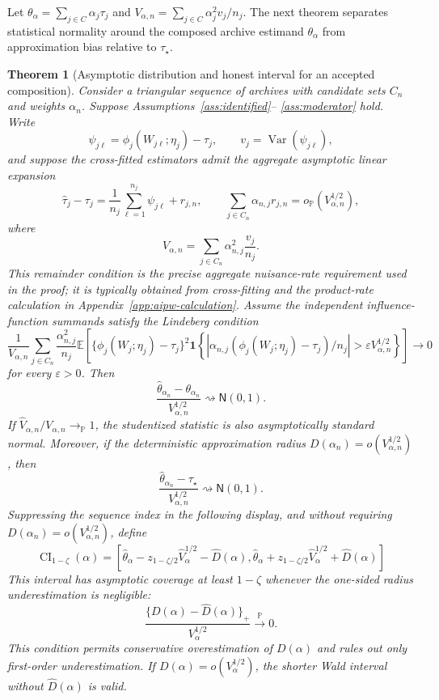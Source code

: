 \documentclass[11pt]{article}
\numberwithin{equation}{section}
\newtheorem{theorem}{Theorem}[section]
\DeclareMathOperator{\Var}{Var}
\newcommand{\E}{\mathbb E}
\newcommand{\Pbb}{\mathbb P}
\newcommand{\1}{\mathbf 1}
\newcommand{\abs}[1]{\left\lvert #1\right\rvert}
\newcommand{\eps}{\varepsilon}
\newcommand{\Normal}{\mathsf N}
\begin{document}
Let \(\theta_\alpha=\sum_{j\in C}\alpha_j\tau_j\) and \(V_{\alpha,n}=\sum_{j\in C}\alpha_j^2v_j/n_j\).  The next theorem separates statistical normality around the composed archive estimand \(\theta_\alpha\) from approximation bias relative to \(\tau_\star\).

\begin{theorem}[Asymptotic distribution and honest interval for an accepted composition]
\label{thm:asymptotic}
Consider a triangular sequence of archives with candidate sets \(C_n\) and
weights \(\alpha_n\). Suppose Assumptions~\ref{ass:identified}--
\ref{ass:moderator} hold. Write
\[
  \psi_{j\ell}
  =
  \phi_j(W_{j\ell};\eta_j)-\tau_j,
  \qquad
  v_j=\Var(\psi_{j\ell}),
\]
and suppose the cross-fitted estimators admit the aggregate asymptotic
linear expansion
\[
  \widehat\tau_j-\tau_j
  =
  \frac{1}{n_j}\sum_{\ell=1}^{n_j}\psi_{j\ell}
  +
  r_{j,n},
  \qquad
  \sum_{j\in C_n}\alpha_{n,j}r_{j,n}
  =
  o_{\Pbb}(V_{\alpha,n}^{1/2}),
\]
where
\[
  V_{\alpha,n}
  =
  \sum_{j\in C_n}\alpha_{n,j}^2\frac{v_j}{n_j}.
\]
This remainder condition is the precise aggregate nuisance-rate
requirement used in the proof; it is typically obtained from cross-fitting
and the product-rate calculation in Appendix~\ref{app:aipw-calculation}. Assume the
independent influence-function summands satisfy the Lindeberg condition
\[
  \frac{1}{V_{\alpha,n}}
  \sum_{j\in C_n}\frac{\alpha_{n,j}^2}{n_j}
  \E\left[
    \{\phi_j(W_j;\eta_j)-\tau_j\}^2
    \1\left\{
      \abs{\alpha_{n,j}
      (\phi_j(W_j;\eta_j)-\tau_j)/n_j}
      >
      \eps V_{\alpha,n}^{1/2}
    \right\}
  \right]
  \to0
\]
for every \(\eps>0\). Then
\begin{equation}
\label{eq:clt-theta}
  \frac{\widehat\theta_{\alpha_n}-\theta_{\alpha_n}}
       {V_{\alpha,n}^{1/2}}
  \rightsquigarrow
  \Normal(0,1).
\end{equation}
If \(\widehat V_{\alpha,n}/V_{\alpha,n}\to_{\Pbb}1\), the studentized
statistic is also asymptotically standard normal. Moreover, if the
deterministic approximation radius
\(D(\alpha_n)=o(V_{\alpha,n}^{1/2})\), then
\[
  \frac{\widehat\theta_{\alpha_n}-\tau_\star}
       {V_{\alpha,n}^{1/2}}
  \rightsquigarrow
  \Normal(0,1).
\]
Suppressing the sequence index in the following display, and without requiring
\(D(\alpha_n)=o(V_{\alpha,n}^{1/2})\), define
\begin{equation}
\label{eq:honest-ci}
  \operatorname{CI}_{1-\zeta}(\alpha)
  =
  \left[
    \widehat\theta_\alpha
    -z_{1-\zeta/2}\widehat V_\alpha^{1/2}
    -\widehat D(\alpha),
    \widehat\theta_\alpha
    +z_{1-\zeta/2}\widehat V_\alpha^{1/2}
    +\widehat D(\alpha)
  \right]
\end{equation}
This interval has asymptotic coverage at least \(1-\zeta\) whenever the one-sided radius
underestimation is negligible:
\[
  \frac{\{D(\alpha)-\widehat D(\alpha)\}_+}
       {V_\alpha^{1/2}}
  \xrightarrow{\Pbb}
  0.
\]
This condition permits conservative overestimation of \(D(\alpha)\) and
rules out only first-order underestimation. If
\(D(\alpha)=o(V_\alpha^{1/2})\), the shorter Wald interval without
\(\widehat D(\alpha)\) is valid.
\end{theorem}
\end{document}
